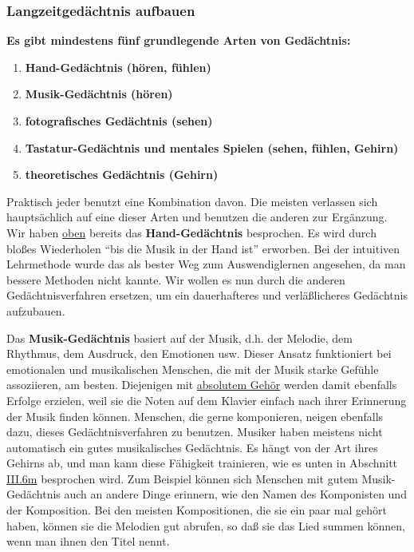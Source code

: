 
\subsubsection{Langzeitgedächtnis aufbauen}
\label{c1iii6j} 

\textbf{Es gibt mindestens fünf grundlegende Arten von Gedächtnis:}

\begin{enumerate}[label={\arabic*.}] 
\item \textbf{Hand-Gedächtnis (hören, fühlen)}
\item \textbf{Musik-Gedächtnis (hören)}
\item \textbf{fotografisches Gedächtnis (sehen)}
\item \textbf{Tastatur-Gedächtnis und mentales Spielen (sehen, fühlen, Gehirn)}
\item \textbf{theoretisches Gedächtnis (Gehirn)}
 \end{enumerate}
Praktisch jeder benutzt eine Kombination davon.
Die meisten verlassen sich hauptsächlich auf eine dieser Arten und benutzen die anderen zur Ergänzung.
\label{c1iii6hand}
Wir haben \hyperref[c1iii6d]{oben} bereits das \textbf{Hand-Gedächtnis} besprochen.
Es wird durch bloßes Wiederholen \enquote{bis die Musik in der Hand ist} erworben.
Bei der intuitiven Lehrmethode wurde das als bester Weg zum Auswendiglernen angesehen, da man bessere Methoden nicht kannte.
Wir wollen es nun durch die anderen Gedächtnisverfahren ersetzen, um ein dauerhafteres und verläßlicheres Gedächtnis aufzubauen.


\label{c1iii6musik}

Das \textbf{Musik-Gedächtnis} basiert auf der Musik, d.h. der Melodie, dem Rhythmus, dem Ausdruck, den Emotionen usw.
Dieser Ansatz funktioniert bei emotionalen und musikalischen Menschen, die mit der Musik starke Gefühle assoziieren, am besten.
Diejenigen mit \hyperref[c1iii12]{absolutem Gehör} werden damit ebenfalls Erfolge erzielen, weil sie die Noten auf dem Klavier einfach nach ihrer Erinnerung der Musik finden können.
Menschen, die gerne komponieren, neigen ebenfalls dazu, dieses Gedächtnisverfahren zu benutzen.
Musiker haben meistens nicht automatisch ein gutes musikalisches Gedächtnis.
Es hängt von der Art ihres Gehirns ab, und man kann diese Fähigkeit trainieren, wie es unten in Abschnitt \hyperref[c1iii6m]{III.6m} besprochen wird.
Zum Beispiel können sich Menschen mit gutem Musik-Gedächtnis auch an andere Dinge erinnern, wie den Namen des Komponisten und der Komposition.
Bei den meisten Kompositionen, die sie ein paar mal gehört haben, können sie die Melodien gut abrufen, so daß sie das Lied summen können, wenn man ihnen den Titel nennt.


